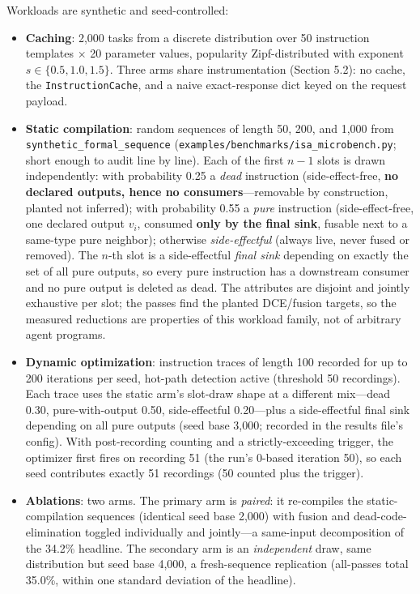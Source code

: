 \documentclass[
  sigconf,
  anonymous]{acmart}
\providecommand{\tightlist}{%
  \setlength{\itemsep}{0pt}\setlength{\parskip}{0pt}}
\begin{document}
Workloads are synthetic and seed-controlled:

\begin{itemize}
\tightlist
\item
  \textbf{Caching}: 2,000 tasks from a discrete distribution over 50
  instruction templates \(\times\) 20 parameter values, popularity
  Zipf-distributed with exponent \(s \in \{0.5, 1.0, 1.5\}\). Three arms
  share instrumentation (Section 5.2): no cache, the
  \texttt{InstructionCache}, and a naive exact-response dict keyed on
  the request payload.
\item
  \textbf{Static compilation}: random sequences of length 50, 200, and
  1,000 from \texttt{synthetic\_formal\_sequence}
  (\texttt{examples/benchmarks/isa\_microbench.py}; short enough to
  audit line by line). Each of the first \(n-1\) slots is drawn
  independently: with probability 0.25 a \emph{dead} instruction
  (side-effect-free, \textbf{no declared outputs, hence no
  consumers}---removable by construction, planted not inferred); with
  probability 0.55 a \emph{pure} instruction (side-effect-free, one
  declared output \(v_i\), consumed \textbf{only by the final sink},
  fusable next to a same-type pure neighbor); otherwise
  \emph{side-effectful} (always live, never fused or removed). The
  \(n\)-th slot is a side-effectful \emph{final sink} depending on
  exactly the set of all pure outputs, so every pure instruction has a
  downstream consumer and no pure output is deleted as dead. The
  attributes are disjoint and jointly exhaustive per slot; the passes
  find the planted DCE/fusion targets, so the measured reductions are
  properties of this workload family, not of arbitrary agent programs.
\item
  \textbf{Dynamic optimization}: instruction traces of length 100
  recorded for up to 200 iterations per seed, hot-path detection active
  (threshold 50 recordings). Each trace uses the static arm's slot-draw
  shape at a different mix---dead 0.30, pure-with-output 0.50,
  side-effectful 0.20---plus a side-effectful final sink depending on
  all pure outputs (seed base 3,000; recorded in the results file's
  config). With post-recording counting and a strictly-exceeding
  trigger, the optimizer first fires on recording 51 (the run's 0-based
  iteration 50), so each seed contributes exactly 51 recordings (50
  counted plus the trigger).
\item
  \textbf{Ablations}: two arms. The primary arm is \emph{paired}: it
  re-compiles the static-compilation sequences (identical seed base
  2,000) with fusion and dead-code-elimination toggled individually and
  jointly---a same-input decomposition of the 34.2\% headline. The
  secondary arm is an \emph{independent} draw, same distribution but
  seed base 4,000, a fresh-sequence replication (all-passes total
  35.0\%, within one standard deviation of the headline).
\end{itemize}
\end{document}
